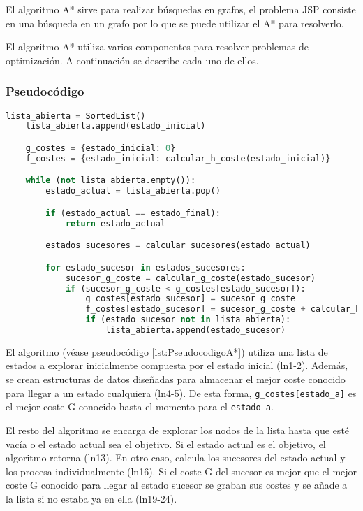 \begin{keynotebox}
    El algoritmo A* sirve para realizar búsquedas en grafos,
    el problema JSP consiste en una búsqueda en un grafo
    por lo que se puede utilizar el A* para resolverlo.
\end{keynotebox}

El algoritmo A* utiliza varios componentes para resolver problemas
de optimización. A continuación se describe cada uno de ellos.

\subsubsection{Pseudocódigo}

\begin{lstlisting}[language=Python, caption=Pseudocódigo del algoritmo A*, label=lst:PseudocodigoA*]
    lista_abierta = SortedList()
    lista_abierta.append(estado_inicial)

    g_costes = {estado_inicial: 0}
    f_costes = {estado_inicial: calcular_h_coste(estado_inicial)}

    while (not lista_abierta.empty()):
        estado_actual = lista_abierta.pop()

        if (estado_actual == estado_final):
            return estado_actual

        estados_sucesores = calcular_sucesores(estado_actual)

        for estado_sucesor in estados_sucesores:
            sucesor_g_coste = calcular_g_coste(estado_sucesor)
            if (sucesor_g_coste < g_costes[estado_sucesor]):
                g_costes[estado_sucesor] = sucesor_g_coste
                f_costes[estado_sucesor] = sucesor_g_coste + calcular_h_coste(estado_sucesor)
                if (estado_sucesor not in lista_abierta):
                    lista_abierta.append(estado_sucesor)
\end{lstlisting}

El algoritmo (véase pseudocódigo \ref{lst:PseudocodigoA*}) utiliza una lista de estados a explorar
inicialmente compuesta por el estado inicial (ln1-2).
Además, se crean estructuras de datos diseñadas para almacenar
el mejor coste conocido para llegar a un estado cualquiera (ln4-5).
De esta forma, \lstinline{g_costes[estado_a]} es el mejor coste G
conocido hasta el momento para el \lstinline{estado_a}.

El resto del algoritmo se encarga de explorar los nodos
de la lista hasta que esté vacía o el estado actual sea el objetivo.
Si el estado actual es el objetivo, el algoritmo retorna (ln13).
En otro caso, calcula los sucesores del estado actual
y los procesa individualmente (ln16).
Si el coste G del sucesor es mejor que el mejor coste G
conocido para llegar al estado sucesor
se graban sus costes y se añade a la lista
si no estaba ya en ella (ln19-24).

